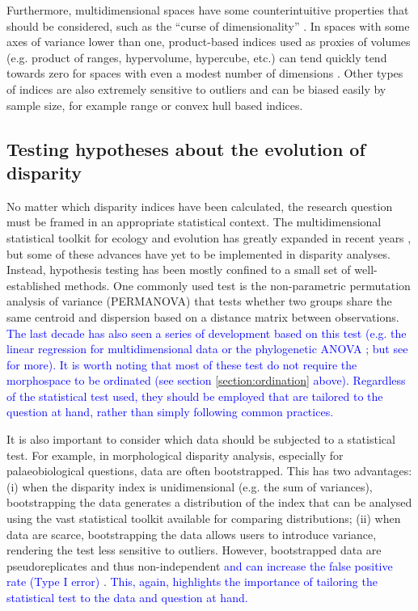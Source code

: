 \documentclass[12pt,letterpaper]{article}
\begin{document}
Furthermore, multidimensional spaces have some counterintuitive properties that should be considered, such as the ``curse of dimensionality'' \citep{Bellman1966}.
In spaces with some axes of variance lower than one, product-based indices used as proxies of volumes (e.g. product of ranges, hypervolume, hypercube, etc.) can tend quickly tend towards zero for spaces with even a modest number of dimensions \citep{Bellman1966}.
Other types of indices are also extremely sensitive to outliers and can be biased easily by sample size, for example range \citep{Wills2001} or convex hull based \citep{Jackson2011} indices.

\subsection{Testing hypotheses about the evolution of disparity} \label{section:testing}

No matter which disparity indices have been calculated, the research question must be framed in an appropriate statistical context.
The multidimensional statistical toolkit for ecology and evolution has greatly expanded in recent years \citep{clavel2015mvmorph, Adams2018}, but some of these advances have yet to be implemented in disparity analyses.
Instead, hypothesis testing has been mostly confined to a small set of well-established methods.
One commonly used test is the non-parametric permutation analysis of variance (PERMANOVA) \citep{Anderson2001} that tests whether two groups share the same centroid and dispersion based on a distance matrix between observations.
\textcolor{blue}{The last decade has also seen a series of development based on this test (e.g. the linear regression for multidimensional data \citealt{collyer2015method} or the phylogenetic ANOVA \citealt{Adams2014}; but see \citealt{Adams2018,lloyd2016} for more).
It is worth noting that most of these test do not require the morphospace to be ordinated (see section \ref{section:ordination} above).
Regardless of the statistical test used, they should be employed that are tailored to the question at hand, rather than simply following common practices.}

It is also important to consider which data should be subjected to a statistical test.
For example, in morphological disparity analysis, especially for palaeobiological questions, data are often bootstrapped.
This has two advantages: (i) when the disparity index is unidimensional (e.g. the sum of variances), bootstrapping the data generates a distribution of the index that can be analysed using the vast statistical toolkit available for comparing distributions; (ii) when data are scarce, bootstrapping the data allows users to introduce variance, rendering the test less sensitive to outliers.
However, bootstrapped data are pseudoreplicates and thus non-independent \textcolor{blue}{and can increase the false positive rate (Type I error)} \citep{strube1988bootstrap}.
\textcolor{blue}{This, again, highlights the importance of tailoring the statistical test to the data and question at hand.}
\end{document}
